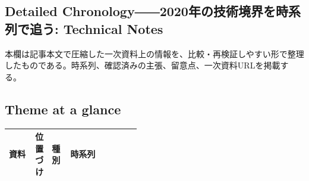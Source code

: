 \subsection*{Detailed Chronology――2020年の技術境界を時系列で追う: Technical Notes}
本欄は記事本文で圧縮した一次資料上の情報を、比較・再検証しやすい形で整理したものである。時系列、確認済みの主張、留意点、一次資料URLを掲載する。
\medskip
\subsection*{Theme at a glance}
\begin{center}
\footnotesize
\begin{tabularx}{\linewidth}{@{}p{0.20\linewidth}p{0.10\linewidth}p{0.14\linewidth}X@{}}
\toprule
資料 & 位置づけ & 種別 & 時系列 \\
\midrule
\bottomrule
\end{tabularx}
\end{center}
\normalsize
